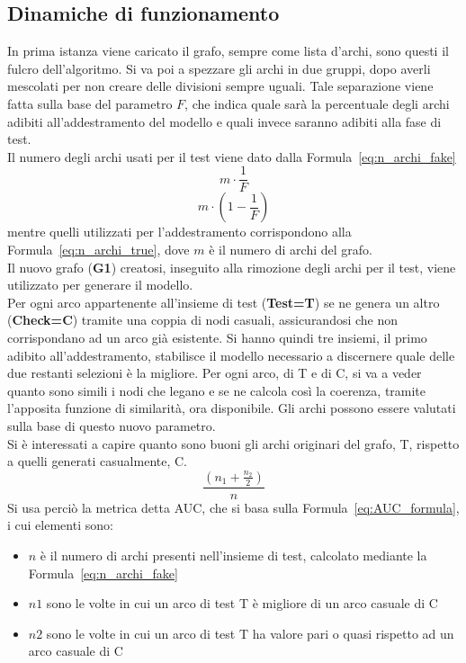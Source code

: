 \subsection{Dinamiche di funzionamento}
In prima istanza viene caricato il grafo, sempre come lista d'archi, sono questi il fulcro dell'algoritmo. Si va poi a spezzare gli archi in due gruppi, dopo averli mescolati per non creare delle divisioni sempre uguali. Tale separazione viene fatta sulla base del parametro $F$, che indica quale sarà la percentuale degli archi adibiti all'addestramento del modello e quali invece saranno adibiti alla fase di test.\\
Il numero degli archi usati per il test viene dato dalla Formula~\ref{eq:n_archi_fake}
\begin{equation}
	m \cdot \frac{1}{F}
	\label{eq:n_archi_fake}
\end{equation} 
\begin{equation}
	m \cdot \left( 1- \frac{1}{F} \right)
	\label{eq:n_archi_true}
\end{equation}
mentre quelli utilizzati per l'addestramento corrispondono alla Formula~\ref{eq:n_archi_true}, dove $m$ è il numero di archi del grafo.\\
Il nuovo grafo (\textbf{G1}) creatosi, inseguito alla rimozione degli archi per il test, viene utilizzato per generare il modello.\\
Per ogni arco appartenente all'insieme di test (\textbf{Test=T}) se ne genera un altro (\textbf{Check=C}) tramite una coppia di nodi casuali, assicurandosi che non corrispondano ad un arco già esistente. Si hanno quindi tre insiemi, il primo adibito all'addestramento, stabilisce il modello necessario a discernere quale delle due restanti selezioni è la migliore.
Per ogni arco, di T e di C, si va a veder quanto sono simili i nodi che legano e se ne calcola così la coerenza, tramite l'apposita funzione di similarità, ora disponibile. Gli archi possono essere valutati sulla base di questo nuovo parametro.\\
Si è interessati a capire quanto sono buoni gli archi originari del grafo, T, rispetto a quelli generati casualmente, C. 
\begin{equation}
	\frac{\left( n_1 + \frac{n_2}{2} \right)}{n}
	\label{eq:AUC_formula}
\end{equation}
Si usa perciò la metrica detta AUC\cite{AUC_metric}, che si basa sulla Formula~\ref{eq:AUC_formula}, i cui elementi sono:
\begin{itemize}
	\item $n$ è il numero di archi presenti nell'insieme di test, calcolato mediante la Formula~\ref{eq:n_archi_fake}
	\item $n1$ sono le volte in cui un arco di test T è migliore di un arco casuale di C
	\item $n2$ sono le volte in cui un arco di test T ha valore pari o quasi rispetto ad un arco casuale di C
\end{itemize}
